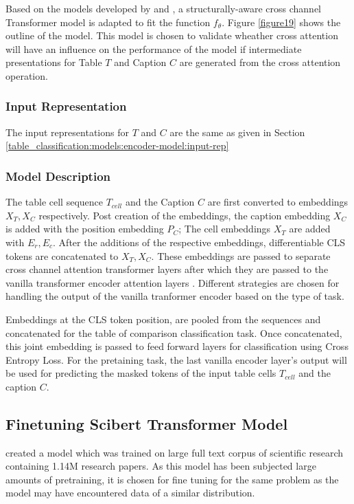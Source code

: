 Based on the models developed by \cite{tsai2019multimodal} and \cite{deng2020turl}, a structurally-aware cross channel Transformer model is adapted to fit the function $f_\theta$. Figure \ref{figure19} shows the outline of the model. This model is chosen to validate wheather cross attention will have an influence on the performance of the model if intermediate presentations for Table $T$ and Caption $C$ are generated from the cross attention operation. 

\subsubsection{Input Representation}
The input representations for $T$ and $C$ are the same as given in Section \ref{table_classification:models:encoder-model:input-rep}


\subsubsection{Model Description}
The table cell sequence $T_{cell}$ and the Caption $C$ are first converted to embeddings $X_T, X_C$ respectively. Post creation of the embeddings,  the caption embedding  $X_C$ is added with the position embedding $P_C$; The cell embeddings $X_T$ are added with $E_r,E_c$. After the additions of the respective embeddings, differentiable CLS tokens are concatenated to $X_T,X_C$.
These embeddings are passed to separate cross channel attention transformer layers \parencite{tsai2019multimodal} after which they are passed to the vanilla transformer encoder attention layers \parencite{vaswani2017attention}. Different strategies are chosen for handling the output of the vanilla tranformer encoder based on the type of task. 

Embeddings at the CLS token position, are pooled from the sequences and concatenated for the table of comparison classification task. Once concatenated, this joint embedding is passed to feed forward layers for classification using Cross Entropy Loss. For the pretaining task, the last vanilla encoder layer’s output will be used for predicting the masked tokens of the input table cells $T_{cell}$ and the caption $C$.

\subsection{Finetuning Scibert Transformer Model}
\cite{beltagy2019scibert} created a model which was trained on large full text corpus of scientific research containing 1.14M research papers. As this model has been subjected large amounts of pretraining, it is chosen for fine tuning for the same problem as the model may have encountered data of a similar distribution. 
